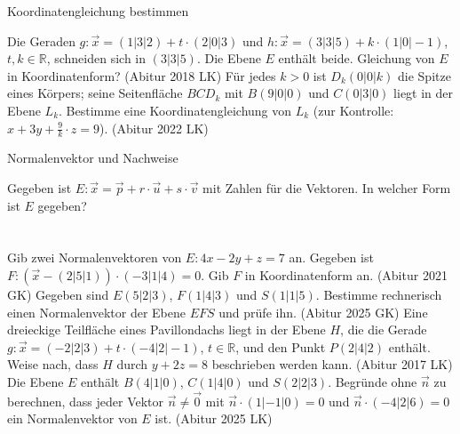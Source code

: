 \begin{aufgabe}{Koordinatengleichung bestimmen}
\begin{teile}
\teil Die Geraden $g\colon \vec x = (1 | 3 | 2) + t \cdot (2 | 0 | 3)$ und $h\colon \vec x = (3 | 3 | 5) + k \cdot (1 | 0 | -1)$, $t, k \in \mathbb{R}$, schneiden sich in $(3 | 3 | 5)$. Die Ebene $E$ enthält beide. Gleichung von $E$ in Koordinatenform? \hfill (Abitur 2018 LK)
\teil Für jedes $k > 0$ ist $D_k(0 | 0 | k)$ die Spitze eines Körpers; seine Seitenfläche $BCD_k$ mit $B(9 | 0 | 0)$ und $C(0 | 3 | 0)$ liegt in der Ebene $L_k$. Bestimme eine Koordinatengleichung von $L_k$ (zur Kontrolle: $x + 3y + \frac{9}{k} \cdot z = 9$). \hfill (Abitur 2022 LK)
\end{teile}
\end{aufgabe}

\begin{aufgabe}{Normalenvektor und Nachweise}
\begin{teile}
\teil Gegeben ist $E\colon \vec x = \vec p + r \cdot \vec u + s \cdot \vec v$ mit Zahlen für die Vektoren. In welcher Form ist $E$ gegeben? \\  \\  \\ 
\teil Gib zwei Normalenvektoren von $E\colon 4x - 2y + z = 7$ an.
\teil Gegeben ist $F\colon \left(\vec x - (2 | 5 | 1)\right) \cdot (-3 | 1 | 4) = 0$. Gib $F$ in Koordinatenform an. \hfill (Abitur 2021 GK)
\teil Gegeben sind $E(5 | 2 | 3)$, $F(1 | 4 | 3)$ und $S(1 | 1 | 5)$. Bestimme rechnerisch einen Normalenvektor der Ebene $EFS$ und prüfe ihn. \hfill (Abitur 2025 GK)
\teil Eine dreieckige Teilfläche eines Pavillondachs liegt in der Ebene $H$, die die Gerade $g\colon \vec x = (-2 | 2 | 3) + t \cdot (-4 | 2 | -1)$, $t \in \mathbb{R}$, und den Punkt $P(2 | 4 | 2)$ enthält. Weise nach, dass $H$ durch $y + 2z = 8$ beschrieben werden kann. \hfill (Abitur 2017 LK)
\teil Die Ebene $E$ enthält $B(4 | 1 | 0)$, $C(1 | 4 | 0)$ und $S(2 | 2 | 3)$. Begründe ohne $\vec n$ zu berechnen, dass jeder Vektor $\vec n \ne \vec 0$ mit $\vec n \cdot (1 | -1 | 0) = 0$ und $\vec n \cdot (-4 | 2 | 6) = 0$ ein Normalenvektor von $E$ ist. \hfill (Abitur 2025 LK)
\end{teile}
\end{aufgabe}

